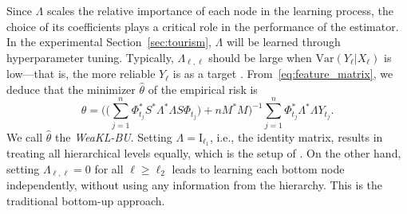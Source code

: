 Since $\Lambda$ scales the relative importance of each node in the learning process, the choice of its coefficients plays a critical role in the performance of the estimator. 
In the experimental Section~\ref{sec:tourism}, $\Lambda$ will be learned through hyperparameter tuning. Typically, $\Lambda_{\ell, \ell}$ should be large when $\mathrm{Var}(Y_\ell | X_\ell)$ is low---that is, the more reliable $Y_\ell$ is as a target \citep{Wickramasuriya2019optimal}. From~\eqref{eq:feature_matrix}, we deduce that the minimizer $\hat \theta$ of the empirical risk is 
    \begin{equation}
    \label{eq:pikl-bu}
        \hat \theta = \Big(\Big(\sum_{j=1}^n \mathbb \Phi_{t_j}^\ast S^\ast\Lambda^\ast \Lambda S\mathbb \Phi_{t_j}\Big) + n M^\ast M\Big)^{-1} \sum_{j=1}^n \mathbb \Phi_{t_j}^\ast \Lambda^\ast \Lambda Y_{t_j}.
    \end{equation}
We call $\hat{\theta}$ the {\it WeaKL-BU}. Setting $\Lambda = \mathrm{I}_{\ell_1}$, i.e., the identity matrix, results in treating all hierarchical levels equally, which is the setup of \citet{rangapuram21end}. On the other hand, setting $\Lambda_{\ell, \ell} = 0$ for all $\ell \geq \ell_2$ leads to learning each bottom node independently, without using any information from the hierarchy. 
This is the traditional bottom-up approach.

